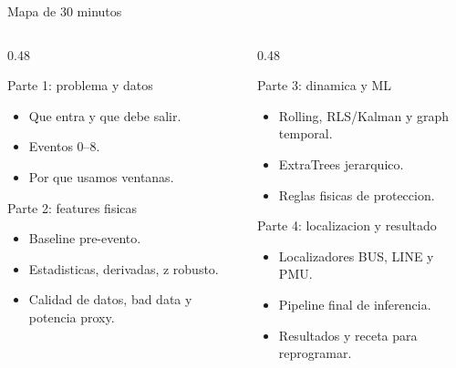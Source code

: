 \documentclass[10pt,aspectratio=169]{beamer}
\begin{document}
\begin{frame}{Mapa de 30 minutos}
\small
\begin{columns}[T,totalwidth=\textwidth]
\begin{column}{0.48\textwidth}
\begin{block}{Parte 1: problema y datos}
\begin{itemize}
  \item Que entra y que debe salir.
  \item Eventos 0--8.
  \item Por que usamos ventanas.
\end{itemize}
\end{block}
\begin{block}{Parte 2: features fisicas}
\begin{itemize}
  \item Baseline pre-evento.
  \item Estadisticas, derivadas, z robusto.
  \item Calidad de datos, bad data y potencia proxy.
\end{itemize}
\end{block}
\end{column}
\begin{column}{0.48\textwidth}
\begin{block}{Parte 3: dinamica y ML}
\begin{itemize}
  \item Rolling, RLS/Kalman y graph temporal.
  \item ExtraTrees jerarquico.
  \item Reglas fisicas de proteccion.
\end{itemize}
\end{block}
\begin{block}{Parte 4: localizacion y resultado}
\begin{itemize}
  \item Localizadores BUS, LINE y PMU.
  \item Pipeline final de inferencia.
  \item Resultados y receta para reprogramar.
\end{itemize}
\end{block}
\end{column}
\end{columns}
\end{frame}

\end{document}
